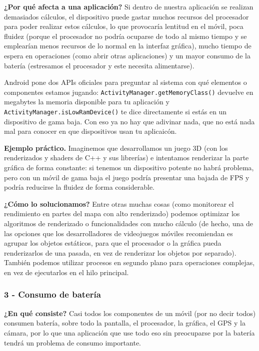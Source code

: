 \documentclass[11pt,a4paper]{article}
\newcommand{\code}[1]{\texttt{\color{navylight}#1}}
\newcommand{\campo}[1]{\textbf{\color{navy}#1}}
\begin{document}
	\campo{¿Por qué afecta a una aplicación?}
	Si dentro de nuestra aplicación se realizan demasiados cálculos, el dispositivo puede gastar muchos recursos del procesador para poder realizar estos cálculos, lo que provocaría lentitud en el móvil, poca fluidez (porque el procesador no podría ocuparse de todo al mismo tiempo y se emplearían menos recursos de lo normal en la interfaz gráfica), mucho tiempo de espera en operaciones (como abrir otras aplicaciones) y un mayor consumo de la batería (estresamos el procesador y este necesita alimentarse).
	
	Android pone dos APIs oficiales para preguntar al sistema con qué elementos o componentes estamos jugando:
	\code{ActivityManager.getMemoryClass()} devuelve en megabytes la memoria disponible para tu aplicación y \code{ActivityManager.isLowRamDevice()} te dice directamente si estás en un dispositivo de gama baja. Con eso ya no hay que adivinar nada, que no está nada mal para conocer en que dispositivos usan tu aplicaicón.
	
	\campo{Ejemplo práctico.}
	Imaginemos que desarrollamos un juego 3D (con los renderizados y shaders de C++ y sus librerías) e intentamos renderizar la parte gráfica de forma constante: si tenemos un dispositivo potente no habrá problema, pero con un móvil de gama baja el juego podría presentar una bajada de FPS y podría reducirse la fluidez de forma considerable.
	
	\campo{¿Cómo lo solucionamos?}
	Entre otras muchas cosas (como monitorear el rendimiento en partes del mapa con alto renderizado) podemos optimizar los algoritmos de renderizado o funcionalidades con mucho cálculo (de hecho, una de las opciones que los desarrolladores de videojuegos móviles recomiendan es agrupar los objetos estáticos, para que el procesador o la gráfica pueda renderizarlos de una pasada, en vez de renderizar los objetos por separado). También podemos utilizar procesos en segundo plano para operaciones complejas, en vez de ejecutarlos en el hilo principal.
	
	\subsubsection*{3 - Consumo de batería}
	
	\campo{¿En qué consiste?}
	Casi todos los componentes de un móvil (por no decir todos) consumen batería, sobre todo la pantalla, el procesador, la gráfica, el GPS y la cámara, por lo que una aplicación que use todo eso sin preocuparse por la batería tendrá un problema de consumo importante.
	
\end{document}
